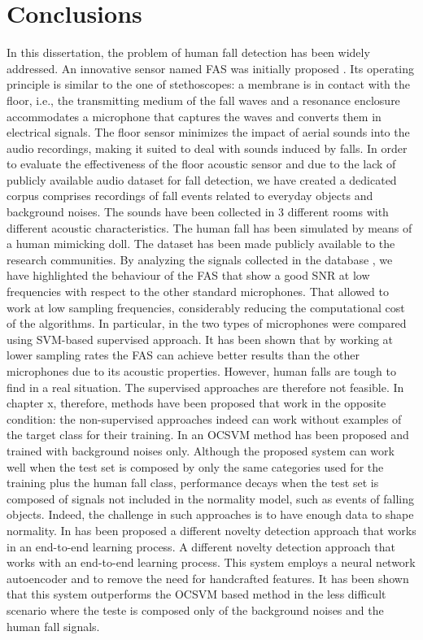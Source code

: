  
\chapter{Conclusions}

In this dissertation, the problem of human fall detection has been widely addressed. An innovative sensor named FAS was initially proposed . Its operating principle is similar to the one of stethoscopes: a membrane is in contact with the floor, i.e., the transmitting medium of the fall waves and a resonance enclosure accommodates a microphone that captures the waves and converts them in electrical signals. The floor sensor minimizes the impact of aerial sounds into the audio recordings, making it suited to deal with sounds induced by falls. In order to evaluate the effectiveness of the floor acoustic sensor and due to the lack of publicly available audio dataset for fall detection, we have created a dedicated corpus comprises recordings of fall events related to everyday objects and background noises. The sounds have been collected in 3 different rooms with different acoustic characteristics. The human fall has been simulated by means of a human mimicking doll. The dataset has been made publicly available to the research communities. By analyzing the signals collected in the database , we have highlighted the behaviour of the FAS that show a good SNR at low frequencies with respect to the other standard microphones. That allowed to work at low sampling frequencies, considerably reducing the computational cost of the algorithms. In particular, in  the two types of microphones were compared using SVM-based supervised approach. It has been shown that by working at lower sampling rates the FAS can achieve better results than the other microphones due to its acoustic properties. However, human falls are tough to find in a real situation. The supervised approaches are therefore not feasible. In chapter x, therefore, methods have been proposed that work in the opposite condition: the non-supervised approaches indeed can work without examples of the target class for their training. In  an OCSVM method has been proposed and trained with background noises only. Although the proposed system can work well when the test set is composed by only the same categories used for the training plus the human fall class, performance decays when the test set is composed of signals not included in the normality model, such as events of falling objects. Indeed, the challenge in such approaches is to have enough data to shape normality. In  has been proposed a different novelty detection approach that works in an end-to-end learning process. A different novelty detection approach that works with an end-to-end learning process. This system employs a neural network autoencoder and to remove the need for handcrafted features. It has been shown that this system outperforms the OCSVM based method in the less difficult scenario where the teste is composed only of the background noises and the human fall signals.